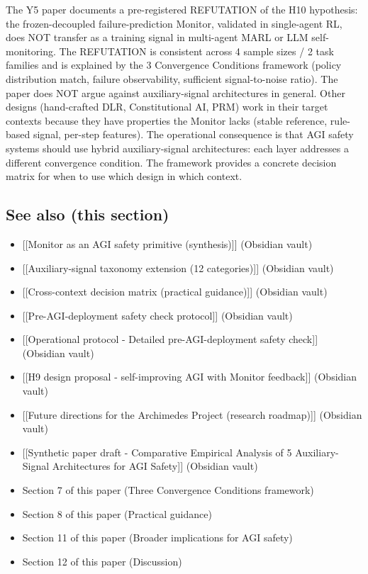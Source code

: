 \documentclass[11pt]{article}
\begin{document}
The Y5 paper documents a pre-registered REFUTATION of the H10
hypothesis: the frozen-decoupled failure-prediction Monitor, validated
in single-agent RL, does NOT transfer as a training signal in
multi-agent MARL or LLM self-monitoring. The REFUTATION is consistent
across 4 sample sizes / 2 task families and is explained by the 3
Convergence Conditions framework (policy distribution match, failure
observability, sufficient signal-to-noise ratio). The paper does NOT
argue against auxiliary-signal architectures in general. Other designs
(hand-crafted DLR, Constitutional AI, PRM) work in their target contexts
because they have properties the Monitor lacks (stable reference,
rule-based signal, per-step features). The operational consequence is
that AGI safety systems should use hybrid auxiliary-signal
architectures: each layer addresses a different convergence condition.
The framework provides a concrete decision matrix for when to use which
design in which context.

\subsection{See also (this section)}\label{see-also-this-section}

\begin{itemize}

\item
  {[}{[}Monitor as an AGI safety primitive (synthesis){]}{]} (Obsidian
  vault)
\item
  {[}{[}Auxiliary-signal taxonomy extension (12 categories){]}{]}
  (Obsidian vault)
\item
  {[}{[}Cross-context decision matrix (practical guidance){]}{]}
  (Obsidian vault)
\item
  {[}{[}Pre-AGI-deployment safety check protocol{]}{]} (Obsidian vault)
\item
  {[}{[}Operational protocol - Detailed pre-AGI-deployment safety
  check{]}{]} (Obsidian vault)
\item
  {[}{[}H9 design proposal - self-improving AGI with Monitor
  feedback{]}{]} (Obsidian vault)
\item
  {[}{[}Future directions for the Archimedes Project (research
  roadmap){]}{]} (Obsidian vault)
\item
  {[}{[}Synthetic paper draft - Comparative Empirical Analysis of 5
  Auxiliary-Signal Architectures for AGI Safety{]}{]} (Obsidian vault)
\item
  Section 7 of this paper (Three Convergence Conditions framework)
\item
  Section 8 of this paper (Practical guidance)
\item
  Section 11 of this paper (Broader implications for AGI safety)
\item
  Section 12 of this paper (Discussion)
\end{itemize}
\end{document}
